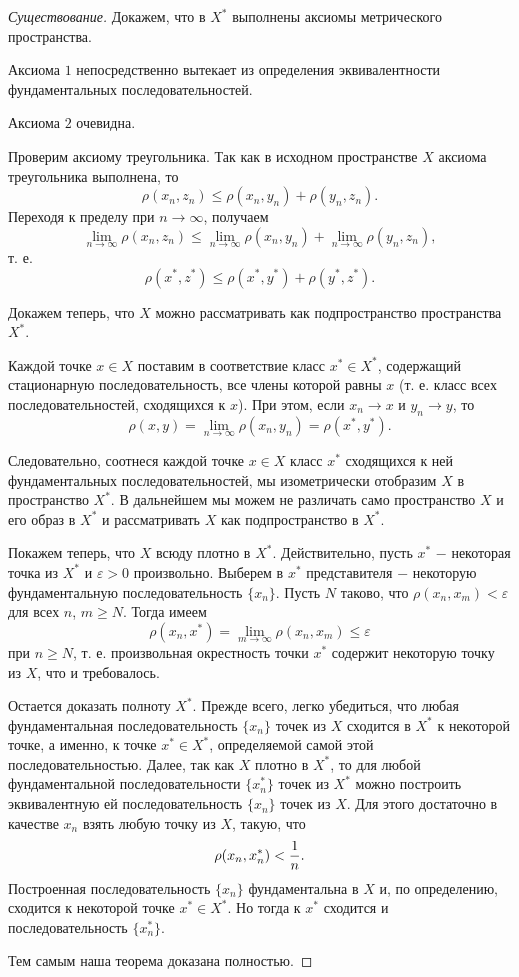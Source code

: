 \documentclass{article}
\begin{document}
\begin{proof}[Существование]
Докажем, что в \(X^{*}\) выполнены аксиомы метрического пространства.

Аксиома \(\textit{1}\) непосредственно вытекает из определения эквивалентности фундаментальных последовательностей.

Аксиома \(\textit{2}\) очевидна.

Проверим аксиому треугольника. Так как в исходном пространстве \(X\) аксиома треугольника выполнена, то
\[
\rho(x_n, z_n) \leq \rho(x_n, y_n) + \rho(y_n, z_n).
\]
Переходя к пределу при \(n \to \infty\), получаем
\[
\lim\limits_{n \to \infty} \rho(x_n, z_n) \leq \lim\limits_{n \to \infty} \rho(x_n, y_n) + \lim\limits_{n \to \infty}\rho(y_n, z_n),
\]
т. е.
\[
\rho(x^{*}, z^{*}) \leq \rho(x^{*}, y^{*}) + \rho(y^{*}, z^{*}).
\]

Докажем теперь, что \(X\) можно рассматривать как подпространство пространства \(X^{*}\).

Каждой точке \(x \in X\) поставим в соответствие класс \(x^{*} \in X^{*}\), содержащий стационарную последовательность, все члены которой равны \(x\) (т. е. класс всех последовательностей, сходящихся к \(x\)). При этом, если \(x_n \to x\) и \(y_n \to y\), то
\[
\rho(x, y) = \lim\limits_{n \to \infty} \rho(x_n, y_n) = \rho(x^{*}, y^{*}).
\]

Следовательно, соотнеся каждой точке \(x \in X\) класс \(x^{*}\) сходящихся к ней фундаментальных последовательностей, мы изометрически отобразим \(X\) в пространство \(X^{*}\). В дальнейшем мы можем не различать само пространство \(X\) и его образ в \(X^{*}\) и рассматривать \(X\) как подпространство в \(X^{*}\).

Покажем теперь, что \(X\) всюду плотно в \(X^{*}\). Действительно, пусть \(x^{*}\) \(-\) некоторая точка из \(X^{*}\) и \(\varepsilon > 0\) произвольно. Выберем в \(x^{*}\) представителя \(-\) некоторую фундаментальную последовательность \(\{x_n\}\). Пусть \(N\) таково, что \(\rho(x_n, x_m) < \varepsilon\) для всех \(n\), \(m \geq N\). Тогда имеем
\[
\rho(x_n, x^{*}) = \lim\limits_{m \to \infty} \rho(x_n, x_m) \leq \varepsilon
\]
при \(n \geq N\), т. е. произвольная окрестность точки \(x^{*}\) содержит некоторую точку из \(X\), что и требовалось.

Остается доказать полноту \(X^{*}\). Прежде всего, легко убедиться, что любая фундаментальная последовательность \(\{x_n\}\) точек из \(X\) сходится в \(X^{*}\) к некоторой точке, а именно, к точке \(x^{*} \in X^{*}\), определяемой самой этой последовательностью. Далее, так как \(X\) плотно в \(X^{*}\), то для любой фундаментальной последовательности \(\{x^{*}_n\}\) точек из \(X^{*}\) можно построить эквивалентную ей последовательность \(\{x_n\}\) точек из \(X\). Для этого достаточно в качестве \(x_n\) взять любую точку из \(X\), такую, что
\[
\rho(x_n, x^{*}_n) < {1 \over n}.
\]
Построенная последовательность \(\{x_n\}\) фундаментальна в \(X\) и, по определению, сходится к некоторой точке \(x^{*} \in X^{*}\). Но тогда к \(x^{*}\) сходится и последовательность \(\{x^{*}_n\}\).

Тем самым наша теорема доказана полностью.
\end{proof}
\end{document}

